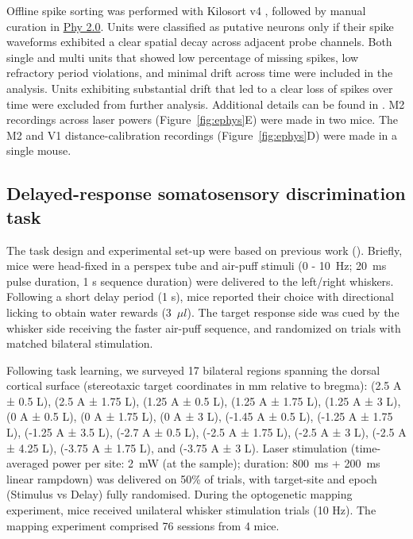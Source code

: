 Offline spike sorting was performed with Kilosort v4 \citep{Pachitariu2024SpikeKilosort4}, followed by manual curation in \href{https://github.com/cortex-lab/phy}{Phy 2.0}.
Units were classified as putative neurons only if their spike waveforms exhibited a clear spatial decay across adjacent probe channels.
Both single and multi units that showed low percentage of missing spikes, low refractory period violations, and minimal drift across time were included in the analysis.
Units exhibiting substantial drift that led to a clear loss of spikes over time were excluded from further analysis.
Additional details can be found in \cite{Gauld2025AActions}.
M2 recordings across laser powers (Figure~\ref{fig:ephys}E) were made in two mice.
The M2 and V1 distance-calibration recordings (Figure~\ref{fig:ephys}D) were made in a single mouse.

\subsection{Delayed-response somatosensory discrimination task}

The task design and experimental set-up were based on previous work (\cite{Gauld2024APerception,Gauld2025AActions}).
Briefly, mice were head-fixed in a perspex tube and air-puff stimuli (0 - 10~Hz; 20~ms pulse duration, 1 s sequence duration) were delivered to the left/right whiskers.
Following a short delay period (1 s), mice reported their choice with directional licking to obtain water rewards (3~$\mu l$).
The target response side was cued by the whisker side receiving the faster air-puff sequence, and randomized on trials with matched bilateral stimulation.

Following task learning, we surveyed 17 bilateral regions spanning the dorsal cortical surface (stereotaxic target coordinates in mm relative to bregma): (2.5 A ± 0.5 L), (2.5 A ± 1.75 L), (1.25 A ± 0.5 L), (1.25 A ± 1.75 L), (1.25 A ± 3 L), (0 A ± 0.5 L), (0 A ± 1.75 L), (0 A ± 3 L), (-1.45 A ± 0.5 L), (-1.25 A ± 1.75 L), (-1.25 A ± 3.5 L), (-2.7 A ± 0.5 L), (-2.5 A ± 1.75 L), (-2.5 A ± 3 L), (-2.5 A ± 4.25 L), (-3.75 A ± 1.75 L), and (-3.75 A ± 3 L).
Laser stimulation (time-averaged power per site: 2~mW (at the sample); duration: 800~ms + 200~ms linear rampdown) was delivered on 50\% of trials, with target-site and epoch (Stimulus vs Delay) fully randomised.
During the optogenetic mapping experiment, mice received unilateral whisker stimulation trials (10 Hz).
The mapping experiment comprised 76 sessions from 4 mice.

